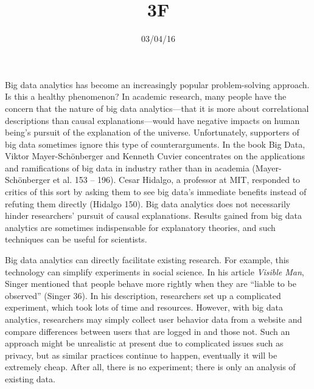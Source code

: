 \documentclass{writing}
\title{3F}
\date{03/04/16}
\begin{document}
\maketitle

Big data analytics has become an increasingly popular problem-solving
approach. Is this a healthy phenomenon? In academic research, many
people have the concern that the nature of big data analytics---that it
is more about correlational descriptions than causal
explanations---would have negative impacts on human being's pursuit of
the explanation of the universe. Unfortunately, supporters of big data
sometimes ignore this type of counterarguments. In the book Big Data,
Viktor Mayer-Schönberger and Kenneth Cuvier concentrates on the
applications and ramifications of big data in industry rather than in
academia (Mayer-Schönberger et al. 153 -- 196). Cesar Hidalgo, a
professor at MIT, responded to critics of this sort by asking them to
see big data's immediate benefits instead of refuting them directly
(Hidalgo 150). Big data analytics does not necessarily hinder
researchers' pursuit of causal explanations. Results gained from big
data analytics are sometimes indispensable for explanatory theories, and
such techniques can be useful for scientists.

Big data analytics can directly facilitate existing research. For
example, this technology can simplify experiments in social science. In
his article \emph{Visible Man}, Singer mentioned that people behave more
rightly when they are ``liable to be observed'' (Singer 36). In his
description, researchers set up a complicated experiment, which took
lots of time and resources. However, with big data analytics,
researchers may simply collect user behavior data from a website and
compare differences between users that are logged in and those not. Such
an approach might be unrealistic at present due to complicated issues
such as privacy, but as similar practices continue to happen, eventually
it will be extremely cheap. After all, there is no experiment; there is
only an analysis of existing data.
\end{document}
